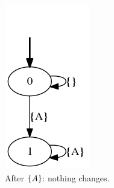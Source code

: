 \begin{example}
\begin{figure}[h!]
		\begin{subfigure}[b]{0.2\textwidth}
			\includegraphics[width=\textwidth]{images/on-the-fly-example-eve/step5.png}
			\caption{After $\{A\}$: nothing changes.}
		\end{subfigure}
		\hfill
		\begin{subfigure}[b]{0.2\textwidth}

\end{subfigure}
\end{figure}
\end{example}
